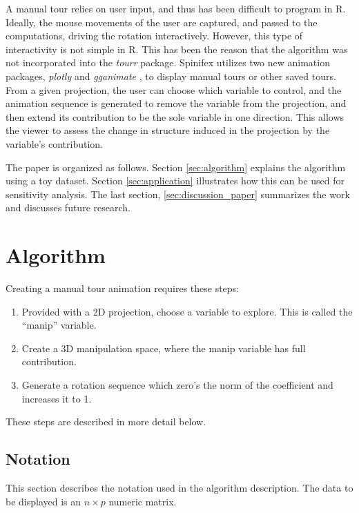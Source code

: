 \documentclass{monashthesis}
\begin{document}
A manual tour relies on user input, and thus has been difficult to
program in R. Ideally, the mouse movements of the user are captured, and
passed to the computations, driving the rotation interactively. However,
this type of interactivity is not simple in R. This has been the reason
that the algorithm was not incorporated into the \emph{tourr} package.
Spinifex utilizes two new animation packages, \emph{plotly}
\autocite{sievert_plotly_2018} and \emph{gganimate}
\autocite{pedersen_gganimate:_2019}, to display manual tours or other
saved tours. From a given projection, the user can choose which variable
to control, and the animation sequence is generated to remove the
variable from the projection, and then extend its contribution to be the
sole variable in one direction. This allows the viewer to assess the
change in structure induced in the projection by the variable's
contribution.

The paper is organized as follows. Section \ref{sec:algorithm} explains
the algorithm using a toy dataset. Section \ref{sec:application}
illustrates how this can be used for sensitivity analysis. The last
section, \ref{sec:discussion_paper} summarizes the work and discusses
future research.

\section{Algorithm}\label{sec:algorithm_paper}

Creating a manual tour animation requires these steps:

\begin{enumerate}
\def\labelenumi{\arabic{enumi}.}
\tightlist
\item
  Provided with a 2D projection, choose a variable to explore. This is
  called the ``manip'' variable.
\item
  Create a 3D manipulation space, where the manip variable has full
  contribution.
\item
  Generate a rotation sequence which zero's the norm of the coefficient
  and increases it to 1.
\end{enumerate}

These steps are described in more detail below.

\subsection{Notation}\label{notation-1}

This section describes the notation used in the algorithm description.
The data to be displayed is an \(n \times p\) numeric matrix.
\end{document}
